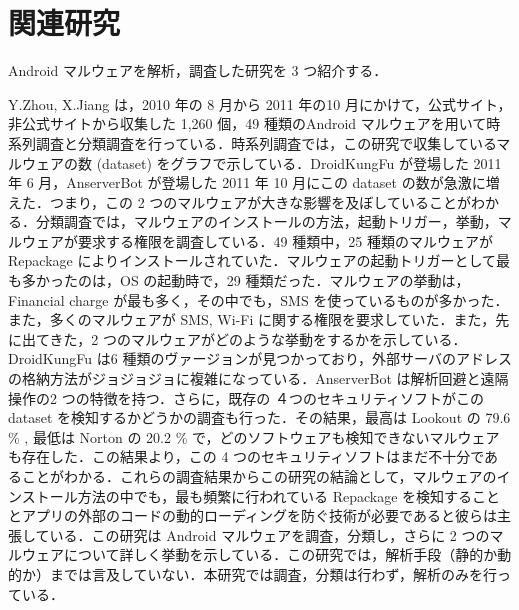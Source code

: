 \documentclass[12pt]{jsarticle}
\begin{document}
\newpage
\section{関連研究}
 Android マルウェアを解析，調査した研究を 3 つ紹介する．

Y.Zhou, X.Jiang は，2010 年の 8 月から 2011 年の10 月にかけて，公式サイト，非公式サイトから収集した 1,260 個，49 種類のAndroid マルウェアを用いて時系列調査と分類調査を行っている．時系列調査では，この研究で収集しているマルウェアの数 (dataset) をグラフで示している．DroidKungFu が登場した 2011 年 6 月，AnserverBot が登場した 2011 年 10 月にこの dataset の数が急激に増えた．つまり，この 2 つのマルウェアが大きな影響を及ぼしていることがわかる．分類調査では，マルウェアのインストールの方法，起動トリガー，挙動，マルウェアが要求する権限を調査している．49 種類中，25 種類のマルウェアが Repackage によりインストールされていた．マルウェアの起動トリガーとして最も多かったのは，OS の起動時で，29 種類だった．マルウェアの挙動は，Financial charge が最も多く，その中でも，SMS を使っているものが多かった．また，多くのマルウェアが SMS, Wi-Fi に関する権限を要求していた．また，先に出てきた，2 つのマルウェアがどのような挙動をするかを示している．DroidKungFu は6 種類のヴァージョンが見つかっており，外部サーバのアドレスの格納方法がジョジョジョに複雑になっている．AnserverBot は解析回避と遠隔操作の2 つの特徴を持つ．さらに，既存の ４つのセキュリティソフトがこの  dataset を検知するかどうかの調査も行った．その結果，最高は Lookout の 79.6 \% , 最低は Norton の 20.2 \% で，どのソフトウェアも検知できないマルウェアも存在した．この結果より，この 4 つのセキュリティソフトはまだ不十分であることがわかる．これらの調査結果からこの研究の結論として，マルウェアのインストール方法の中でも，最も頻繁に行われている Repackage を検知することとアプリの外部のコードの動的ローディングを防ぐ技術が必要であると彼らは主張している．この研究は Android マルウェアを調査，分類し，さらに 2 つのマルウェアについて詳しく挙動を示している．この研究では，解析手段（静的か動的か）までは言及していない．本研究では調査，分類は行わず，解析のみを行っている．
\end{document}

